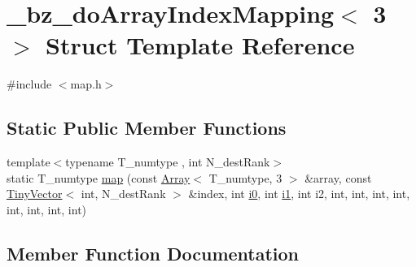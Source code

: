 \hypertarget{struct__bz__doArrayIndexMapping_3_013_01_4}{}\section{\+\_\+bz\+\_\+do\+Array\+Index\+Mapping$<$ 3 $>$ Struct Template Reference}
\label{struct__bz__doArrayIndexMapping_3_013_01_4}


{\ttfamily \#include $<$map.\+h$>$}

\subsection*{Static Public Member Functions}
\begin{DoxyCompactItemize}
\item 
{\footnotesize template$<$typename T\+\_\+numtype , int N\+\_\+dest\+Rank$>$ }\\static T\+\_\+numtype \hyperlink{struct__bz__doArrayIndexMapping_3_013_01_4_a8cb2d7703669bdd91e6ac7fec1d50732}{map} (const \hyperlink{classArray}{Array}$<$ T\+\_\+numtype, 3 $>$ \&array, const \hyperlink{classTinyVector}{Tiny\+Vector}$<$ int, N\+\_\+dest\+Rank $>$ \&index, int \hyperlink{cephes_8h_aacd2643d920288e61be16787561a4514}{i0}, int \hyperlink{cephes_8h_ab24474d03df1f9adf1700c2c1badd1a5}{i1}, int i2, int, int, int, int, int, int, int, int)
\end{DoxyCompactItemize}


\subsection{Member Function Documentation}
\hypertarget{struct__bz__doArrayIndexMapping_3_013_01_4_a8cb2d7703669bdd91e6ac7fec1d50732}{}
